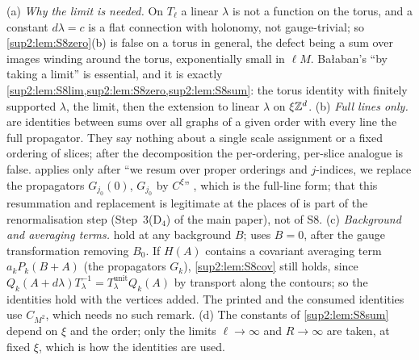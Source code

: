 \begin{remark}\label{sup2:rem:S8scope}
\textup{(a)} \emph{Why the limit is needed.} On $T_\ell$ a linear $\lambda$ is not a function on the torus, and a constant $d\lambda=c$ is a flat connection with holonomy, not gauge-trivial; so \cref{sup2:lem:S8zero}(b) is false on a torus in general, the defect being a sum over images winding around the torus, exponentially small in $\ell M$. Ba{\l}aban's ``by taking a limit'' is essential, and it is exactly \cref{sup2:lem:S8lim,sup2:lem:S8zero,sup2:lem:S8sum}: the torus identity with finitely supported $\lambda$, the limit, then the extension to linear $\lambda$ on $\xi\mathbb Z^d$.
\textup{(b)} \emph{Full lines only.}  are identities between sums over all graphs of a given order with every line the full propagator. They say nothing about a single scale assignment or a fixed ordering of slices; after the decomposition \cite[(2.6)]{Ba3} the per-ordering, per-slice analogue is false. \cite{Ba3} applies \cite[(2.26)]{Ba3} only after ``we resum over proper orderings and $j$-indices, we replace the propagators $G_{j_0}(0)$, $G_{j_0}$ by $C^\xi$'' \cite[p.~442]{Ba3}, which is the full-line form; that this resummation and replacement is legitimate at the places of \cite[Sect.~3]{Ba3} is part of the renormalisation step (Step~3(D$_4$) of the main paper), not of S8.
\textup{(c)} \emph{Background and averaging terms.}  hold at any background $B$; \cite{Ba3} uses $B=0$, after the gauge transformation removing $B_0$. If $H(A)$ contains a covariant averaging term $a_kP_k(B+A)$ (the propagators $G_k$), \cref{sup2:lem:S8cov} still holds, since $Q_k(A+d\lambda)T_\lambda^{-1}=T^{\mathrm{unit}}_\lambda Q_k(A)$ by transport along the contours; so the identities hold with the vertices \cite[(1.13)--(1.15)]{Ba3} added. The printed and the consumed identities use $C_{M^2}$, which needs no such remark. \textup{(d)} The constants of \cref{sup2:lem:S8sum} depend on $\xi$ and the order; only the limits $\ell\to\infty$ and $R\to\infty$ are taken, at fixed $\xi$, which is how the identities are used.
\end{remark}
